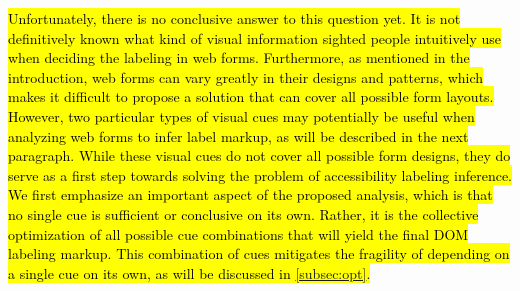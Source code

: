 \hl{
Unfortunately, there is no conclusive answer to this question yet. It is not 
definitively known what kind of visual information sighted people intuitively 
use when deciding the labeling in web forms. Furthermore, as mentioned in the 
introduction, web forms can vary greatly in their designs and patterns, which makes 
it difficult to propose a solution that can cover all possible form layouts. 
However, two particular types of 
visual cues may potentially be useful when analyzing web forms to infer label markup, as
will be described in the next paragraph. 
While these visual cues do not cover all possible form designs, they do serve 
as a first step towards solving the problem of accessibility labeling inference. 
We first emphasize an important aspect of the proposed analysis, which is that 
no single cue is sufficient or conclusive on its own. Rather, it is the collective optimization of all possible cue combinations that will yield the final DOM labeling markup. 
This combination of cues mitigates the fragility of depending on a single cue on its own, as will be discussed in \mbox{\cref{subsec:opt}}.
}

